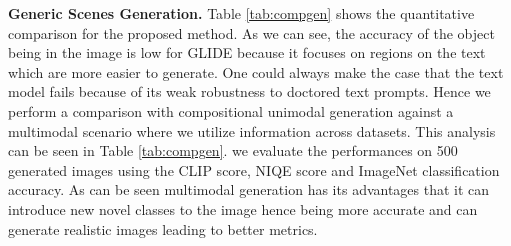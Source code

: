 \documentclass[10pt,twocolumn,letterpaper]{article}
\begin{document}
\begin{table}[t]
\caption{\textbf{Comparison for generic scenes creation.} Here we consider three different reliability values  and report the best possible value.Acc denotes ImageNet classification  accuracy}
\label{tab:compgen}
\vspace{-3mm}
\end{table}
 
 \noindent\textbf{Generic Scenes Generation.} Table \ref{tab:compgen} shows the quantitative comparison for the proposed method. As we can see, the accuracy of the object being in the image is low for GLIDE \cite{nichol2021glide}  because it focuses on regions on the text which are more easier to generate.  One could always make the case that the text model fails because of its weak robustness to doctored text prompts. Hence we perform a comparison with compositional unimodal generation \cite{liu2022compositional}  against a multimodal scenario where we utilize information across datasets. This analysis can be seen in Table \ref{tab:compgen}. we evaluate the performances on 500 generated images using the CLIP score, NIQE score and ImageNet classification accuracy. As can be seen multimodal generation has its advantages that it can introduce new novel classes to the image hence being more accurate and can generate realistic images leading to better metrics.
\end{document}
